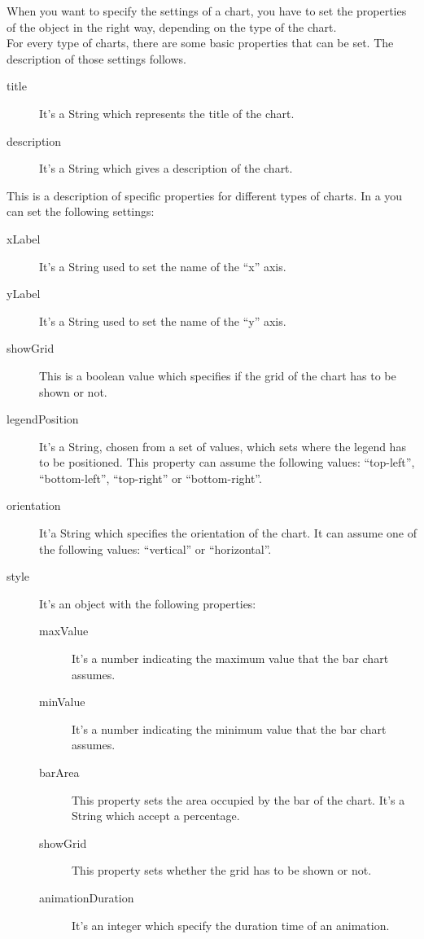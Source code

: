 			When you want to specify the settings of a chart, you have to set the properties of the  object in the right way, depending on the type of the chart.\\
			For every type of charts, there are some basic properties that can be set. The description of those settings follows.
			\begin{description}
				\item[title] It's a String which represents the title of the chart.
				\item[description] It's a String which gives a description of the chart.
			\end{description}
			This is a description of specific properties for different types of charts.
				In a  you can set the following settings:
				\begin{description}
					\item[xLabel] It's a String used to set the name of the “x” axis.
					\item[yLabel] It's a String used to set the name of the “y” axis.
					\item[showGrid] This is a boolean value which specifies if the grid of the chart has to be shown or not.
					\item[legendPosition] It's a String, chosen from a set of values, which sets where the legend has to be positioned. This property can assume the following values: “top-left”, “bottom-left”, “top-right” or “bottom-right”.
					\item[orientation] It'a String which specifies the orientation of the chart. It can assume one of the following values: “vertical” or “horizontal”.
					\item[style] It's an object with the following properties:
					\begin{description}
						\item[maxValue] It's a number indicating the maximum value that the bar chart assumes.
						\item[minValue] It's a number indicating the minimum value that the bar chart assumes.
						\item[barArea] This property sets the area occupied by the bar of the chart. It's a String which accept a percentage.
						\item[showGrid] This property sets whether the grid has to be shown or not.
						\item[animationDuration] It's an integer which specify the duration time of an animation.
					\end{description}
				\end{description}
